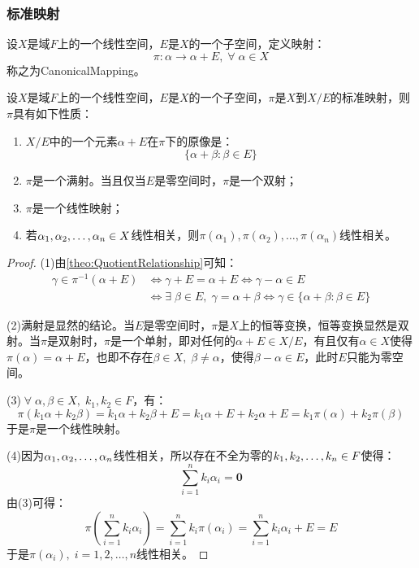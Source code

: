 \subsubsection{标准映射}
\begin{definition}
	设$X$是域$F$上的一个线性空间，$E$是$X$的一个子空间，定义映射：
	\begin{equation*}
		\pi:\alpha\longrightarrow\alpha+E,\;\forall\;\alpha\in X
	\end{equation*}
	称之为\gls{CanonicalMapping}。
\end{definition}
\begin{property}\label{prop:CanonicalMap}
	设$X$是域$F$上的一个线性空间，$E$是$X$的一个子空间，$\pi$是$X$到$X/E$的标准映射，则$\pi$具有如下性质：
	\begin{enumerate}
		\item $X/E$中的一个元素$\alpha+E$在$\pi$下的原像是：
		\begin{equation*}
			\{\alpha+\beta:\beta\in E\}
		\end{equation*}
		\item $\pi$是一个满射。当且仅当$E$是零空间时，$\pi$是一个双射；
		\item $\pi$是一个线性映射；
		\item 若$\alpha_1, \alpha_2, \dots, \alpha_{n}\in X$线性相关，则$\pi(\alpha_1),\pi(\alpha_2),\dots,\pi(\alpha_n)$线性相关。
	\end{enumerate}
\end{property}
\begin{proof}
	(1)由\cref{theo:QuotientRelationship}可知：
	\begin{align*}
		\gamma\in\pi^{-1}(\alpha+E)
		&\iff
		\gamma+E=\alpha+E
		\iff
		\gamma-\alpha\in E \\
		&\iff
		\exists\;\beta\in E,\;\gamma=\alpha+\beta
		\iff
		\gamma\in\{\alpha+\beta:\beta\in E\}
	\end{align*}\par
	(2)满射是显然的结论。当$E$是零空间时，$\pi$是$X$上的恒等变换，恒等变换显然是双射。当$\pi$是双射时，$\pi$是一个单射，即对任何的$\alpha+E\in X/E$，有且仅有$\alpha\in X$使得$\pi(\alpha)=\alpha+E$，也即不存在$\beta\in X,\;\beta\ne\alpha$，使得$\beta-\alpha\in E$，此时$E$只能为零空间。\par
	(3)$\;\forall\;\alpha,\beta\in X,\;k_1,k_2\in F$，有：
	\begin{equation*}
		\pi(k_1\alpha+k_2\beta)=k_1\alpha+k_2\beta+E=k_1\alpha+E+k_2\alpha+E=k_1\pi(\alpha)+k_2\pi(\beta)
	\end{equation*}
	于是$\pi$是一个线性映射。\par
	(4)因为$\alpha_1, \alpha_2, \dots, \alpha_{n}$线性相关，所以存在不全为零的$k_1, k_2, \dots, k_{n}\in F$使得：
	\begin{equation*}
		\sum_{i=1}^{n}k_i\alpha_i=\mathbf{0}
	\end{equation*}
	由(3)可得：
	\begin{equation*}
		\pi\left(\sum_{i=1}^{n}k_i\alpha_i\right)=\sum_{i=1}^{n}k_i\pi(\alpha_i)=\sum_{i=1}^{n}k_i\alpha_i+E=E
	\end{equation*}
	于是$\pi(\alpha_i),\;i=1,2,\dots,n$线性相关。
\end{proof}

